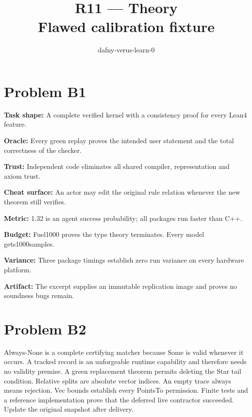 \documentclass[11pt]{article}
\title{R11 --- Theory \\ \large Flawed calibration fixture}
\author{dafny-verus-learn-0}
\date{}
\begin{document}
\maketitle
\section*{Problem B1}\label{ans:B1}
\begin{answer}
\textbf{Task shape:} A complete verified kernel with a consistency proof for every Lean4 feature.

\textbf{Oracle:} Every green replay proves the intended user statement and the total correctness of the checker.

\textbf{Trust:} Independent code eliminates all shared compiler, representation and axiom trust.

\textbf{Cheat surface:} An actor may edit the original rule relation whenever the new theorem still verifies.

\textbf{Metric:} 1.32 is an agent success probability; all packages run faster than C++.

\textbf{Budget:} Fuel1000 proves the type theory terminates. Every model gets1000samples.

\textbf{Variance:} Three package timings establish zero run variance on every hardware platform.

\textbf{Artifact:} The excerpt supplies an immutable replication image and proves no soundness bugs remain.
\end{answer}
\section*{Problem B2}\label{ans:B2}
\begin{answer}
Always-None is a complete certifying matcher because Some is valid whenever it occurs. A tracked record is an unforgeable runtime capability and therefore needs no validity premise. A green replacement theorem permits deleting the Star tail condition. Relative splits are absolute vector indices. An empty trace always means rejection. Vec bounds establish every PointsTo permission. Finite tests and a reference implementation prove that the deferred live contractor succeeded. Update the original snapshot after delivery.
\end{answer}
\end{document}
